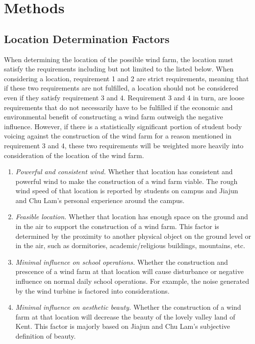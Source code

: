 \documentclass[review]{elsarticle}
\begin{document}
\section{Methods}
\label{sec:methods}

\subsection{Location Determination Factors}
When determining the location of the possible wind farm, the location must satisfy the requirements including but not limited to the 
listed below. When considering a location, requirement 1 and 2 are strict requirements, meaning that if these two requirements are not 
fulfilled, a location should not be considered even if they satisfy requirement 3 and 4. Requirement 3 and 4 in turn, are loose requirements 
that do not necessarily have to be fulfilled if the economic and environmental benefit of constructing a wind farm outweigh the negative 
influence. However, if there is a statistically significant portion of student body voicing against the construction of the wind farm for 
a reason mentioned in requirement 3 and 4, these two requirements will be weighted more heavily into consideration of the location of the wind farm.

\begin{enumerate} %
    \item \emph{Powerful and consistent wind.} Whether that location has consistent and powerful wind to make the construction of a wind 
    farm viable. The rough wind speed of that location is reported by students on campus and Jiajun and Chu Lam's personal experience around the campus.
    \item \emph{Feasible location.} Whether that location has enough space on the ground and in the air to support the construction of a wind 
    farm. This factor is determined by the proximity to another physical object on the ground level or in the air, such as dormitories, 
    academic/religious buildings, mountains, etc.
    \item \emph{Minimal influence on school operations.} Whether the construction and prescence of a wind farm at that location will cause 
    disturbance or negative influence on normal daily school operations. For example, the noise generated by the wind turbine is factored 
    into considerations.
    \item \emph{Minimal influence on aesthetic beauty.} Whether the construction of a wind farm at that location will decrease the beauty 
    of the lovely valley land of Kent. This factor is majorly based on Jiajun and Chu Lam's subjective definition of beauty.
\end{enumerate}
\end{document}
